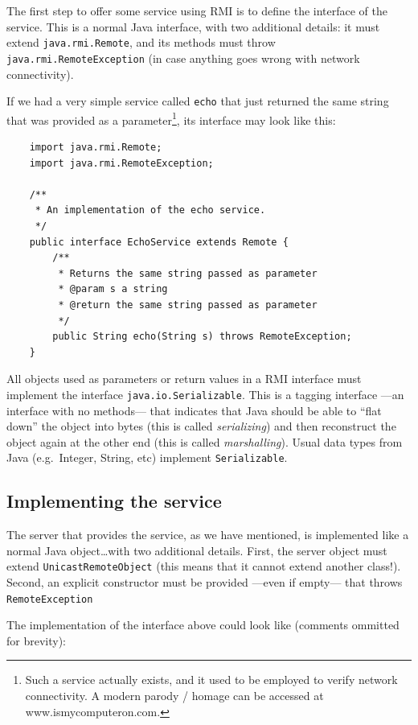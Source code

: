 The first step to offer some service using RMI is to define the
interface of the service. This is a normal Java interface, with two
additional details: it must extend \verb+java.rmi.Remote+, and its
methods must throw \verb+java.rmi.RemoteException+ (in case anything
goes wrong with network connectivity). 

If we had a very simple service called \verb+echo+ that just returned
the same string that was provided as a parameter\footnote{Such a
  service actually exists, and it used to be employed to verify
  network connectivity. A modern parody / homage can be accessed at
  www.ismycomputeron.com.}, 
its interface may look like this: 

\begin{verbatim}
    import java.rmi.Remote;
    import java.rmi.RemoteException;

    /** 
     * An implementation of the echo service.
     */
    public interface EchoService extends Remote {
        /**
         * Returns the same string passed as parameter
         * @param s a string 
         * @return the same string passed as parameter
         */
        public String echo(String s) throws RemoteException;
    }
\end{verbatim}

All objects used as parameters or return values in a RMI interface
must implement the interface \verb+java.io.Serializable+. This is a
tagging interface ---an interface with no methods--- that indicates
that Java should be able to ``flat down'' the object into bytes
(this is called \emph{serializing}) 
and then reconstruct the object again at the other end
(this is called \emph{marshalling}).  
Usual data types from Java (e.g.~Integer, String, etc)
implement \verb+Serializable+.

\subsection{Implementing the service}
\label{sec:implementing-service}

The server that provides the service, 
as we have mentioned, is implemented like a normal Java
object\ldots with two additional details. First, the server object
must extend \verb+UnicastRemoteObject+ (this means that it cannot 
extend another class!). Second, an explicit constructor
must be provided ---even if empty--- that throws
\verb+RemoteException+

The implementation of the interface above could look like (comments
ommitted for brevity): 

